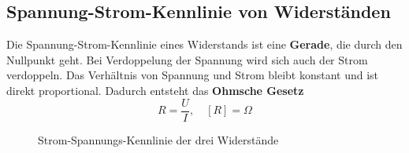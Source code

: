 \subsection{Spannung-Strom-Kennlinie von Widerständen}
Die Spannung-Strom-Kennlinie eines Widerstands ist eine \textbf{Gerade}, die durch den Nullpunkt geht. Bei Verdoppelung der Spannung wird sich auch der Strom verdoppeln. Das Verhältnis von Spannung und Strom bleibt konstant und ist direkt proportional. Dadurch entsteht das \textbf{Ohmsche Gesetz}
\begin{equation}
\boxed{R=\dfrac{U}{I},\quad [R]=\Omega}
\end{equation}
\begin{figure}[H]
\centering
{}
\caption{Strom-Spannungs-Kennlinie der drei Widerstände}
\end{figure}
